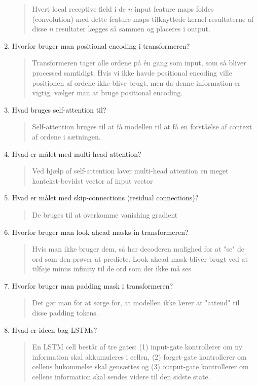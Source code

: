 \documentclass[a4paper]{report}
\begin{document}
\begin{enumerate}
\begin{figure}[htbp]
    \end{figure}
    \begin{quote}
        Hvert local receptive field i de $n$ input feature maps foldes (convolution) med dette feature maps tilknyttede kernel resultaterne af disse $n$ resultater lægges så sammen og placeres i output.
    \end{quote}
    \item Hvorfor bruger man positional encoding i transformeren?
    \begin{quote}
        Transformeren tager alle ordene på én gang som input, som så bliver processed samtidigt. Hvis vi ikke havde positional encoding ville positionen af ordene ikke blive brugt, men da denne information er vigtig, vælger man at bruge positional encoding.
    \end{quote}
    \item Hvad bruges self-attention til?
    \begin{quote}
        Self-attention bruges til at få modellen til at få en forståelse af context af ordene i sætningen.
    \end{quote}
    \item Hvad er målet med multi-head attention?
    \begin{quote}
        Ved hjælp af self-attention laver multi-head attention en meget kontekst-bevidst vector af input vector 
    \end{quote}
    \item Hvad er målet med skip-connections (residual connections)?
    \begin{quote}
        De bruges til at overkomme vanishing gradient
    \end{quote}
    \item Hvorfor bruger man look ahead masks in transformeren?
    \begin{quote}
        Hvis man ikke bruger dem, så har decoderen mulighed for at "se" de ord som den prøver at predicte. Look ahead mask bliver brugt ved at tilføje minus infinity til de ord som der ikke må ses
    \end{quote}
    \item Hvorfor bruger man padding mask i transformeren?
    \begin{quote}
        Det gør man for at sørge for, at modellen ikke lærer at "attend" til disse padding tokens.
    \end{quote}
    \item Hvad er ideen bag LSTMs?
    \begin{quote}
        En LSTM cell består af tre gates: (1) input-gate kontrollerer om ny information skal akkumuleres i cellen, (2) forget-gate kontrollerer om cellens hukommelse skal gensættes og (3) output-gate kontrollerer om cellens information skal sendes videre til den sidste state.
    \end{quote}
\end{enumerate}
\end{document}
